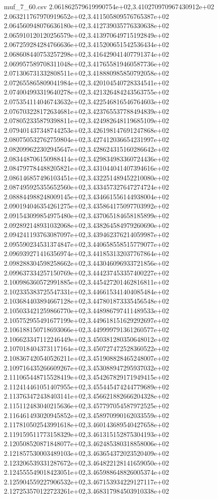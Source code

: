 \begin{filecontents*}{muf_7_60.csv}
2.061862579619990754e+02,3.410270970967430912e+02
2.063211767970919652e+02,3.411505809576765387e+02
2.064560948076636180e+02,3.412739035776330638e+02
2.065910120120256579e+02,3.413970649715192849e+02
2.067259284284766636e+02,3.415200651542536434e+02
2.068608440753257298e+02,3.416429041407791374e+02
2.069957589708311048e+02,3.417655819460587736e+02
2.071306731332808511e+02,3.418880985850792058e+02
2.072655865809041984e+02,3.420104540728334541e+02
2.074004993319640278e+02,3.421326484243563755e+02
2.075354114046743632e+02,3.422546816546764603e+02
2.076703228172634681e+02,3.423765537788494839e+02
2.078052335879398811e+02,3.424982648119685109e+02
2.079401437348744253e+02,3.426198147691247868e+02
2.080750532762759804e+02,3.427412036654231997e+02
2.082099622302945647e+02,3.428624315160286642e+02
2.083448706150988414e+02,3.429834983360724436e+02
2.084797784488205821e+02,3.431044041407394616e+02
2.086146857496103451e+02,3.432251489452210080e+02
2.087495925355652560e+02,3.433457327647274724e+02
2.088844988248009145e+02,3.434661556144938004e+02
2.090194046354261275e+02,3.435864175097703992e+02
2.091543099854975480e+02,3.437065184658185899e+02
2.092892148931032068e+02,3.438264584979260690e+02
2.094241193763087097e+02,3.439462376214059987e+02
2.095590234531374847e+02,3.440658558515779077e+02
2.096939271416356974e+02,3.441853132037767864e+02
2.098288304598258662e+02,3.443046096933721856e+02
2.099637334257150769e+02,3.444237453357400227e+02
2.100986360572991885e+02,3.445427201462816811e+02
2.102335383725547331e+02,3.446615341404085484e+02
2.103684403894667128e+02,3.447801873335456548e+02
2.105033421259866770e+02,3.448986797411489533e+02
2.105752955491677199e+02,3.449618151629292697e+02
2.106188150718693066e+02,3.449999791361260577e+02
2.106623347112246449e+02,3.450381280350648012e+02
2.107018404373117164e+02,3.450727472528360522e+02
2.108367420540526211e+02,3.451908828465248007e+02
2.109716435266609267e+02,3.453088947295937032e+02
2.111065448715528419e+02,3.454267829171949415e+02
2.112414461051407955e+02,3.455445474244779689e+02
2.113763472438403141e+02,3.456621882666204328e+02
2.115112483040215636e+02,3.457797054587972525e+02
2.116461493020945852e+02,3.458970990162033559e+02
2.117810502543991618e+02,3.460143689540427658e+02
2.119159511773158329e+02,3.461315152875304193e+02
2.120508520871848077e+02,3.462485380318858006e+02
2.121857530003489103e+02,3.463654372023520409e+02
2.123206539331287672e+02,3.464822128141659050e+02
2.124555549018423051e+02,3.465988648826005374e+02
2.125904559227906532e+02,3.467153934229127117e+02
2.127253570122723261e+02,3.468317984503910338e+02

\end{filecontents*}
